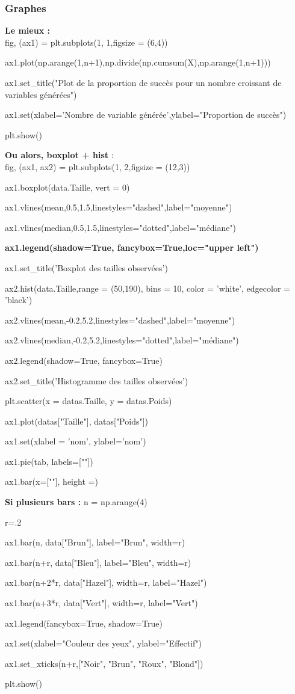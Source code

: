 \documentclass[../main.tex]{subfiles}
\begin{document}
\subsubsection{Graphes}
\quad\textbf{ Le mieux :\\}
fig, (ax1) = plt.subplots(1, 1,figsize = (6,4))

ax1.plot(np.arange(1,n+1),np.divide(np.cumsum(X),np.arange(1,n+1)))

ax1.set\_title("Plot de la proportion de succès pour un nombre croissant de variables générées")

ax1.set(xlabel='Nombre de variable générée',ylabel="Proportion de succès")

plt.show()

\textbf{Ou alors, boxplot + hist} :\\
fig, (ax1, ax2) = plt.subplots(1, 2,figsize = (12,3))

ax1.boxplot(data.Taille, vert = 0)

ax1.vlines(mean,0.5,1.5,linestyles="dashed",label="moyenne")

ax1.vlines(median,0.5,1.5,linestyles="dotted",label="médiane")

\textbf{ax1.legend(shadow=True, fancybox=True,loc="upper left")}

ax1.set\_title('Boxplot des tailles observées')

ax2.hist(data.Taille,range = (50,190), bins = 10, color = 'white', edgecolor = 'black')
            
ax2.vlines(mean,-0.2,5.2,linestyles="dashed",label="moyenne")

ax2.vlines(median,-0.2,5.2,linestyles="dotted",label="médiane")

ax2.legend(shadow=True, fancybox=True)

ax2.set\_title('Histogramme des tailles observées')

plt.scatter(x = datas.Taille, y = datas.Poids)

ax1.plot(datas["Taille"], datas["Poids"])

ax1.set(xlabel = 'nom', ylabel='nom')

ax1.pie(tab, labels=[""])

ax1.bar(x=[""], height =)

\textbf{Si plusieurs bars :}
n = np.arange(4)

r=.2

ax1.bar(n, data["Brun"], label="Brun", width=r)

ax1.bar(n+r, data["Bleu"], label="Bleu", width=r)

ax1.bar(n+2*r, data["Hazel"], width=r, label="Hazel")

ax1.bar(n+3*r, data["Vert"], width=r, label="Vert")

ax1.legend(fancybox=True, shadow=True)

ax1.set(xlabel="Couleur des yeux", ylabel="Effectif")

ax1.set\_xticks(n+r,["Noir", "Brun", "Roux", "Blond"])


plt.show()
\end{document}
